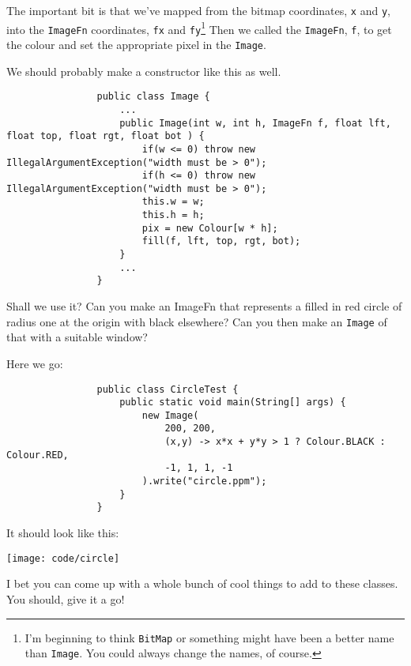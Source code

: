 \documentclass{article}
\begin{document}
            The important bit is that we've mapped from the bitmap coordinates, \texttt{x} and \texttt{y}, into the \texttt{ImageFn}
            coordinates, \texttt{fx} and \texttt{fy}\footnote{I'm beginning to think \texttt{BitMap} or something might have been a better
            name than \texttt{Image}. You could always change the names, of course.} Then we called the \texttt{ImageFn}, \texttt{f}, to
            get the colour and set the appropriate pixel in the \texttt{Image}.
            
            We should probably make a constructor like this as well.

            \begin{verbatim}
                public class Image {
                    ...
                    public Image(int w, int h, ImageFn f, float lft, float top, float rgt, float bot ) {
                        if(w <= 0) throw new IllegalArgumentException("width must be > 0");
                        if(h <= 0) throw new IllegalArgumentException("width must be > 0");
                        this.w = w;
                        this.h = h;
                        pix = new Colour[w * h];
                        fill(f, lft, top, rgt, bot);
                    }
                    ...
                }
            \end{verbatim}
            
            Shall we use it? Can you make an ImageFn that represents a filled in red circle of radius one at the origin with black
            elsewhere? Can you then make an \texttt{Image} of that with a suitable window?
            
            Here we go:
            
            \begin{verbatim}
                public class CircleTest {
                    public static void main(String[] args) {
                        new Image(
                            200, 200,
                            (x,y) -> x*x + y*y > 1 ? Colour.BLACK : Colour.RED,
                            -1, 1, 1, -1 
                        ).write("circle.ppm");
                    }
                }
            \end{verbatim}
            
            It should look like this:
            
            \texttt{[image: code/circle]}
            

            I bet you can come up with a whole bunch of cool things to add to these classes.  You should, give it a go!
            
\end{document}
